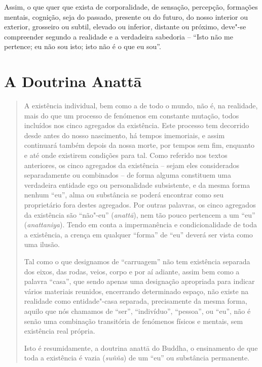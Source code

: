 Assim, o que quer que exista de corporalidade, de sensação, percepção, formações
mentais, cognição, seja do passado, presente ou do futuro, do nosso interior ou
exterior, grosseiro ou subtil, elevado ou inferior, distante ou próximo, deve"-se
compreender segundo a realidade e a verdadeira sabedoria -- ``Isto não me
pertence; eu não sou isto; isto não é o que eu sou''.


\section{A Doutrina Anattā}

\begin{quote}
  A existência individual, bem como a de todo o mundo, não é, na realidade, mais
  do que um processo de fenómenos em constante mutação, todos incluídos nos
  cinco agregados da existência. Este processo tem decorrido desde antes do
  nosso nascimento, há tempos imemoriais, e assim continuará também depois da
  nossa morte, por tempos sem fim, enquanto e até onde existirem condições para
  tal. Como referido nos textos anteriores, os cinco agregados da existência --
  sejam eles considerados separadamente ou combinados -- de forma alguma
  constituem uma verdadeira entidade ego ou personalidade subsistente, e da
  mesma forma nenhum ``eu'', alma ou substância se poderá encontrar como seu
  proprietário fora destes agregados. Por outras palavras, os cinco agregados da
  existência são ``não"-eu'' (\emph{anattā}), nem tão pouco pertencem a um ``eu''
  (\emph{anattaniya}). Tendo em conta a impermanência e condicionalidade de toda
  a existência, a crença em qualquer ``forma'' de ``eu'' deverá ser vista como
  uma ilusão.

  Tal como o que designamos de ``carruagem'' não tem existência separada dos
  eixos, das rodas, veios, corpo e por aí adiante, assim bem como a palavra
  ``casa'', que sendo apenas uma designação apropriada para indicar vários
  materiais reunidos, encerrando determinado espaço, não existe na realidade
  como entidade"-casa separada, precisamente da mesma forma, aquilo que nós
  chamamos de ``ser'', ``indivíduo'', ``pessoa'', ou ``eu'', não é senão uma
  combinação transitória de fenómenos físicos e mentais, sem existência real
  própria.

  Isto é resumidamente, a doutrina anattā do Buddha, o ensinamento de que toda a
  existência é vazia (\emph{suñña}) de um ``eu'' ou substância permanente.


\end{quote}

